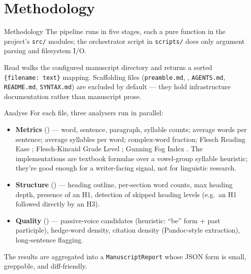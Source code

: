 \documentclass[
  ignorenonframetext,
]{beamer}
\author{\texorpdfstring{}{}}
\date{}
\begin{document}
\section{Methodology}\label{sec:methodology}

\begin{frame}{Methodology}
The pipeline runs in five stages, each a pure function in the project's
\texttt{src/} modules; the orchestrator script in \texttt{scripts/} does
only argument parsing and filesystem I/O.
\end{frame}

\begin{frame}{Read}
\protect{}\label{read}
 walks the configured
manuscript directory and returns a sorted \texttt{\{filename:\ text\}}
mapping. Scaffolding files (\texttt{preamble.md},
, \texttt{AGENTS.md}, \texttt{README.md},
\texttt{SYNTAX.md}) are excluded by default --- they hold infrastructure
documentation rather than manuscript prose.
\end{frame}

\begin{frame}{Analyse}
\protect{}\label{analyse}
For each file, three analysers run in parallel:

\begin{itemize}
\item
  \textbf{Metrics} () ---
  word, sentence, paragraph, syllable counts; average words per
  sentence; average syllables per word; complex-word fraction; Flesch
  Reading Ease ; Flesch-Kincaid Grade Level
  ; Gunning Fog Index
  . The implementations are textbook formulae
  over a vowel-group syllable heuristic; they're good enough for a
  writer-facing signal, not for linguistic research.
\item
  \textbf{Structure} ()
  --- heading outline, per-section word counts, max heading depth,
  presence of an H1, detection of skipped heading levels (e.g.~an H1
  followed directly by an H3).
\item
  \textbf{Quality} () ---
  passive-voice candidates (heuristic: ``be'' form + past participle),
  hedge-word density, citation density (Pandoc-style \texttt{\breakseq{[@key]}}
  extraction), long-sentence flagging.
\end{itemize}

The results are aggregated into a \texttt{ManuscriptReport} whose JSON
form is small, greppable, and diff-friendly.
\end{frame}
\end{document}
